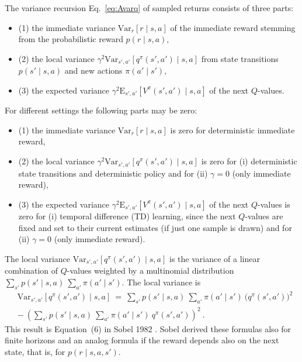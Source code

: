 \documentclass{article}
\newcommand\EXP{\mathbf{\mathrm{E}}}
\newcommand\VAR{\mathbf{\mathrm{Var}}}
\begin{document}
\begin{appendices}
The variance recursion  Eq.~\eqref{eq:Avarq} of sampled returns consists of three parts:
\begin{itemize}
\item (1) the immediate variance
$\VAR_r \left[ r \mid s,a \right]$ of the
immediate reward stemming from the
probabilistic reward $p(r \mid s,a)$,
\item (2) the local
variance $\gamma^2\VAR_{s',a'} \left[q^\pi(s', a') \mid  s,a\right]$ 
from state transitions $p(s' \mid s,a)$ and new actions $\pi(a' \mid s')$,
\item (3) the expected
variance $\gamma^2\EXP_{s',a'}  \left[V^{\pi}(s',a') \mid s,a\right]$
of the next $Q$-values.
\end{itemize}
For different settings the following parts may be zero:
\begin{itemize}
\item (1) the immediate variance
$\VAR_r \left[ r \mid s,a \right]$ is zero for deterministic
immediate reward,
\item (2) the local
variance $\gamma^2\VAR_{s',a'} \left[q^\pi(s', a') \mid  s,a\right]$ 
is zero for (i) deterministic state transitions and deterministic policy
and for (ii) $\gamma=0$ (only immediate reward),
\item (3) the expected
variance $\gamma^2\EXP_{s',a'}  \left[V^{\pi}(s',a') \mid s,a\right]$
of the next $Q$-values is zero for (i) temporal difference (TD) learning,
since the next $Q$-values are fixed and set to their current estimates
(if just one sample is drawn)
and for (ii) $\gamma=0$ (only immediate reward).
\end{itemize}


The local variance $\VAR_{s',a'} \left[q^\pi(s', a') \mid s,a\right]$
is the variance of a linear combination of $Q$-values
weighted by a multinomial distribution
$\sum_{s'} p(s'\mid s,a) \ \sum_{a'} \pi(a' \mid s')$.
The local variance is
\begin{align}
  &\VAR_{s',a'} \left[q^\pi(s', a') \mid s,a\right] \ = \
  \sum_{s'} p(s'\mid s,a) \ \sum_{a'} \pi(a' \mid s')\
  \big( q^\pi(s', a')\big)^2 \\\nonumber
  &- \
    \left( \sum_{s'} p(s'\mid s,a) \ \sum_{a'} \pi(a' \mid
    s') \ q^\pi(s', a')\right)^2 \ .
\end{align}
This result is Equation~(6) in Sobel 1982 \cite{Sobel:82}.
Sobel derived these formulas also for finite horizons and
an analog formula if the reward depends
also on the next state, that is, for $p(r \mid s,a,s')$.



\end{appendices}
\end{document}

